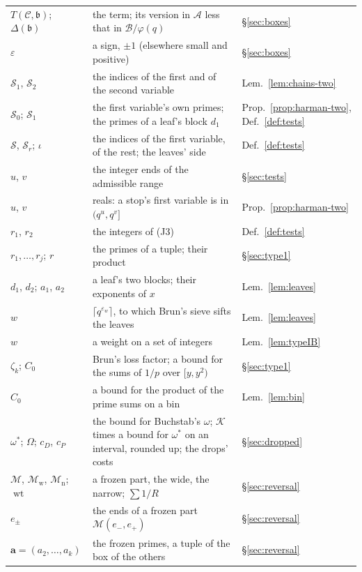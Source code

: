 \documentclass[11pt]{article}
\theoremstyle{definition}
\begin{document}
{\begin{longtable}{@{}>{\raggedright\arraybackslash}p{}
  >{\raggedright\arraybackslash}p{}
  >{\raggedright\arraybackslash}p{}@{}}
$T(\mathcal C, \mathfrak b)$; $\Delta(\mathfrak b)$ & the term; its version in $\mathcal A$ less that in $\mathcal
  B/\varphi(q)$ & \S\ref{sec:boxes} \\
$\varepsilon$ & a sign, $\pm 1$ (elsewhere small and positive) & \S\ref{sec:boxes} \\
$\mathcal S_1$, $\mathcal S_2$ & the indices of the first and of the second variable & Lem.~\ref{lem:chains-two} \\
$\mathcal S_0$; $\mathcal S_1$ & the first variable's own primes; the primes of a leaf's block $d_1$ &
  Prop.~\ref{prop:harman-two}, Def.~\ref{def:tests} \\
$\mathcal S$, $\mathcal S_r$; $\iota$ & the indices of the first variable, of the rest; the leaves' side &
  Def.~\ref{def:tests} \\
$u$, $v$ & the integer ends of the admissible range & \S\ref{sec:tests} \\
$u$, $v$ & reals: a stop's first variable is in $(q^u, q^v]$ & Prop.~\ref{prop:harman-two} \\
$r_1$, $r_2$ & the integers of (J3) & Def.~\ref{def:tests} \\
$r_1, \dots, r_j$; $r$ & the primes of a tuple; their product & \S\ref{sec:type1} \\
$d_1$, $d_2$; $a_1$, $a_2$ & a leaf's two blocks; their exponents of $x$ & Lem.~\ref{lem:leaves} \\
$w$ & $\lceil q^{\varepsilon_w} \rceil$, to which Brun's sieve sifts the leaves & Lem.~\ref{lem:leaves} \\
$w$ & a weight on a set of integers & Lem.~\ref{lem:typeIB} \\
$\zeta_k$; $C_0$ & Brun's loss factor; a bound for the sums of $1/p$ over $[y, y^2)$ & \S\ref{sec:type1} \\
$C_0$ & a bound for the product of the prime sums on a bin & Lem.~\ref{lem:bin} \\
$\omega^*$; $\Omega$; $c_D$, $c_P$ & the bound for Buchstab's $\omega$; $\mathcal K$ times a bound for $\omega^*$ on an
  interval, rounded up; the drops' costs & \S\ref{sec:dropped} \\
$\mathcal M$, $\mathcal M_{\mathrm w}$, $\mathcal M_{\mathrm n}$; $\operatorname{wt}$ & a frozen part, the wide, the
  narrow; $\sum 1/R$ & \S\ref{sec:reversal} \\
$e_\pm$ & the ends of a frozen part $\mathcal M(e_-, e_+)$ & \S\ref{sec:reversal} \\
$\mathbf a = (a_2, \dots, a_k)$ & the frozen primes, a tuple of the box of the others & \S\ref{sec:reversal} \\

\end{longtable}}
\end{document}
